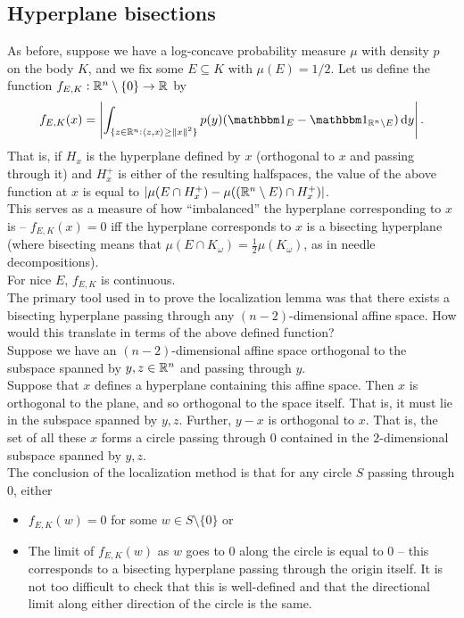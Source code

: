 \documentclass{article}
\begin{document}
	\subsection{Hyperplane bisections}

		As before, suppose we have a log-concave probability measure $\mu$ with density $p$ on the body $K$, and we fix some $E \subseteq K$ with $\mu(E) = 1/2$. Let us define the function $f_{E,K} : \mathbb{R}^n \setminus \{0\} \to \mathbb{R}$ by
		\[ f_{E,K}(x) = \left| \int_{\{ z \in \Rn : \langle z , x \rangle \geq \norm{x}^2 \}} p(y) ( \indic_E - \indic_{\Rn \setminus E} ) \dif y \right|. \]
		That is, if $H_x$ is the hyperplane defined by $x$ (orthogonal to $x$ and passing through it) and $H_x^+$ is either of the resulting halfspaces, the value of the above function at $x$ is equal to $|\mu(E \cap H_x^+) - \mu((\mathbb{R}^n\setminus E) \cap H_x^+)|$.\\
		This serves as a measure of how ``imbalanced'' the hyperplane corresponding to $x$ is -- $f_{E,K}(x) = 0$ iff the hyperplane corresponds to $x$ is a bisecting hyperplane (where bisecting means that $\mu(E \cap K_\omega) = \frac{1}{2} \mu(K_\omega) $, as in needle decompositions).\\
		For nice $E$, $f_{E,K}$ is continuous.\\

		The primary tool used in \cite{lov-sim-on7} to prove the localization lemma was that there exists a bisecting hyperplane passing through any $(n-2)$-dimensional affine space. How would this translate in terms of the above defined function?\\
		Suppose we have an $(n-2)$-dimensional affine space orthogonal to the subspace spanned by $y,z\in\mathbb{R}^n$ and passing through $y$.\\
		Suppose that $x$ defines a hyperplane containing this affine space. Then $x$ is orthogonal to the plane, and so orthogonal to the space itself. That is, it must lie in the subspace spanned by $y, z$. Further, $y-x$ is orthogonal to $x$. That is, the set of all these $x$ forms a circle passing through $0$ contained in the $2$-dimensional subspace spanned by $y,z$.\\
		The conclusion of the localization method is that for any circle $S$ passing through $0$, either
		\begin{itemize}
			\item $f_{E,K}(w) = 0$ for some $w \in S \setminus \{0\}$ or
			\item The limit of $f_{E,K}(w)$ as $w$ goes to $0$ along the circle is equal to $0$ -- this corresponds to a bisecting hyperplane passing through the origin itself. It is not too difficult to check that this is well-defined and that the directional limit along either direction of the circle is the same. 
		\end{itemize}
\end{document}

